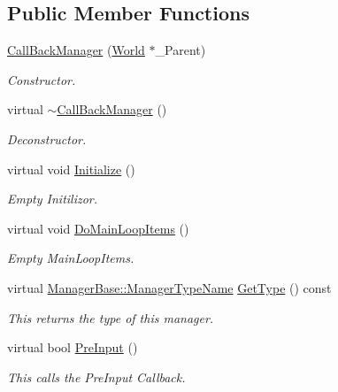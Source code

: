 \subsection*{Public Member Functions}
\begin{DoxyCompactItemize}
\item 
\hyperlink{classphys_1_1CallBackManager_a16d4c60beef774ae904cf01853d71aae}{CallBackManager} (\hyperlink{classphys_1_1World}{World} $\ast$\_\-Parent)
\begin{DoxyCompactList}\small\item\em Constructor. \item\end{DoxyCompactList}\item 
virtual \hyperlink{classphys_1_1CallBackManager_a098b7a7822538aa6d6c4ba690f1e069d}{$\sim$CallBackManager} ()
\begin{DoxyCompactList}\small\item\em Deconstructor. \item\end{DoxyCompactList}\item 
virtual void \hyperlink{classphys_1_1CallBackManager_a3d2af4e3c947b14f628c3e09a96af2f9}{Initialize} ()
\begin{DoxyCompactList}\small\item\em Empty Initilizor. \item\end{DoxyCompactList}\item 
virtual void \hyperlink{classphys_1_1CallBackManager_acaa942de1f6f8b42d06d981121d501e0}{DoMainLoopItems} ()
\begin{DoxyCompactList}\small\item\em Empty MainLoopItems. \item\end{DoxyCompactList}\item 
virtual \hyperlink{classphys_1_1ManagerBase_aaa6ccddf23892eaccb898529414f80a5}{ManagerBase::ManagerTypeName} \hyperlink{classphys_1_1CallBackManager_aa0568dd5c2d1bb6dc669dfa2ca3486ad}{GetType} () const 
\begin{DoxyCompactList}\small\item\em This returns the type of this manager. \item\end{DoxyCompactList}\item 
virtual bool \hyperlink{classphys_1_1CallBackManager_a84e782f8729f49b296691763351ee2b1}{PreInput} ()
\begin{DoxyCompactList}\small\item\em This calls the PreInput Callback. \item\end{DoxyCompactList}\item 

\end{DoxyCompactItemize}
